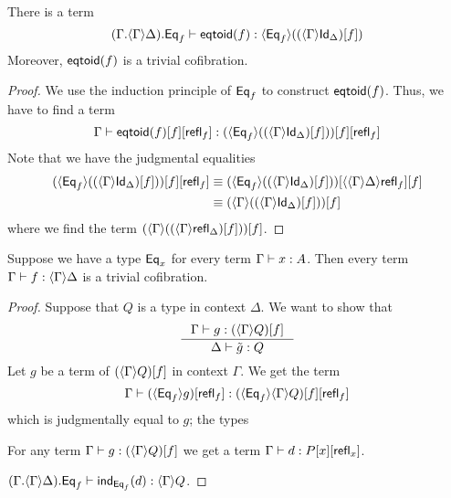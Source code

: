 \begin{conj}
There is a term
\begin{equation*}
\jterm{\ctxext{{\Gamma}{\ctxwk{\Gamma}{\Delta}}}{\eqtype{f}}}{\ctxwk{\eqtype{f}}{\subst{f}{\ctxwk{\Gamma}{\idtypevar{\Delta}}}}}{\eqtoid{f}}
\end{equation*}
Moreover, $\mathsf{eqtoid}(f)$ is a trivial cofibration.
\end{conj}

\begin{proof}
We use the induction principle of $\mathsf{Eq}_{f}$ to construct $\mathsf{eqtoid}(f)$. Thus, we
have to find a term
\begin{equation*}
\jterm
  {\Gamma}
  {\subst{\refl{f}}{{f}{\ctxwk{\eqtype{f}}{\subst{f}{\ctxwk{\Gamma}{\idtypevar{\Delta}}}}}}}
  {\subst{\refl{f}}{{f}{\eqtoid{f}}}}
\end{equation*}
Note that we have the judgmental equalities
\begin{align*}
\subst{\refl{f}}{{f}{\ctxwk{\eqtype{f}}{\subst{f}{\ctxwk{\Gamma}{\idtypevar{\Delta}}}}}}
& \jdeq \subst{f}{{\ctxwk{{\Gamma}{\Delta}}{\refl{f}}}{\ctxwk{\eqtype{f}}{\subst{f}{\ctxwk{\Gamma}{\idtypevar{\Delta}}}}}} \\
& \jdeq \subst{f}{\ctxwk{\Gamma}{\subst{f}{\ctxwk{\Gamma}{\idtypevar{\Delta}}}}}
\end{align*}
where we find the term $\subst{f}{\ctxwk{\Gamma}{\subst{f}{\ctxwk{\Gamma}{\refl{\Delta}}}}}$.
\end{proof}

\begin{conj}
Suppose we have a type $\mathsf{Eq}_{x}$ for every term $\jterm{\Gamma}{A}{x}$. Then
every term $\jterm{\Gamma}{\ctxwk{\Gamma}{\Delta}}{f}$ is a trivial cofibration.
\end{conj}

\begin{proof}
Suppose that $Q$ is a type in context $\Delta$. We want to show that
\begin{equation*}
\inference{\jterm{\Gamma}{\subst{f}{\ctxwk{\Gamma}{Q}}}{g}}{\jterm{\Delta}{Q}{\tilde{g}}}
\end{equation*}
Let $g$ be a term of $\subst{f}{\ctxwk{\Gamma}{Q}}$ in context $\Gamma$. We get
the term
\begin{equation*}
\jterm{\Gamma}{\subst{\refl{f}}{{f}{\ctxwk{\eqtype{f}}{{\Gamma}{Q}}}}}{\subst{\refl{f}}{\ctxwk{\eqtype{f}}{g}}}
\end{equation*}
which is judgmentally equal to $g$; the types

For any term $\jterm{\Gamma}{\subst{f}{\ctxwk{\Gamma}{Q}}}{g}$ we get a term 
$\jterm{\Gamma}{\subst{\refl{x}}{{x}{P}}}{d}$.

$\jterm{\ctxext{{\Gamma}{\ctxwk{\Gamma}{\Delta}}}{\eqtype{f}}}{\ctxwk{\Gamma}{Q}}{\ind{\eqtype{f}}(d)}$.
\end{proof}

